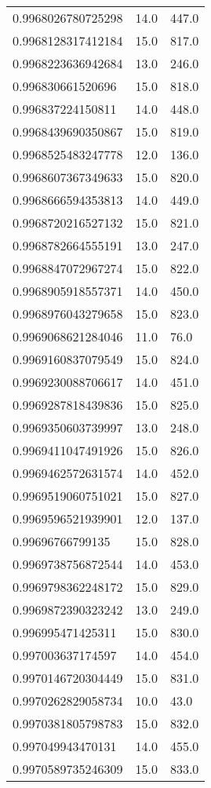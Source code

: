 \begin{center}
\begin{supertabular}[H]{p{0.30\textwidth}p{0.05\textwidth}p{0.05\textwidth}}
0.9968026780725298 & 14.0 & 447.0 \\ 
0.9968128317412184 & 15.0 & 817.0 \\ 
0.9968223636942684 & 13.0 & 246.0 \\ 
0.996830661520696 & 15.0 & 818.0 \\ 
0.996837224150811 & 14.0 & 448.0 \\ 
0.9968439690350867 & 15.0 & 819.0 \\ 
0.9968525483247778 & 12.0 & 136.0 \\ 
0.9968607367349633 & 15.0 & 820.0 \\ 
0.9968666594353813 & 14.0 & 449.0 \\ 
0.9968720216527132 & 15.0 & 821.0 \\ 
0.9968782664555191 & 13.0 & 247.0 \\ 
0.9968847072967274 & 15.0 & 822.0 \\ 
0.9968905918557371 & 14.0 & 450.0 \\ 
0.9968976043279658 & 15.0 & 823.0 \\ 
0.9969068621284046 & 11.0 & 76.0 \\ 
0.9969160837079549 & 15.0 & 824.0 \\ 
0.9969230088706617 & 14.0 & 451.0 \\ 
0.9969287818439836 & 15.0 & 825.0 \\ 
0.9969350603739997 & 13.0 & 248.0 \\ 
0.9969411047491926 & 15.0 & 826.0 \\ 
0.9969462572631574 & 14.0 & 452.0 \\ 
0.9969519060751021 & 15.0 & 827.0 \\ 
0.9969596521939901 & 12.0 & 137.0 \\ 
0.99696766799135 & 15.0 & 828.0 \\ 
0.9969738756872544 & 14.0 & 453.0 \\ 
0.9969798362248172 & 15.0 & 829.0 \\ 
0.9969872390323242 & 13.0 & 249.0 \\ 
0.996995471425311 & 15.0 & 830.0 \\ 
0.997003637174597 & 14.0 & 454.0 \\ 
0.9970146720304449 & 15.0 & 831.0 \\ 
0.9970262829058734 & 10.0 & 43.0 \\ 
0.9970381805798783 & 15.0 & 832.0 \\ 
0.997049943470131 & 14.0 & 455.0 \\ 
0.9970589735246309 & 15.0 & 833.0 \\ 

\end{supertabular}
\end{center}
